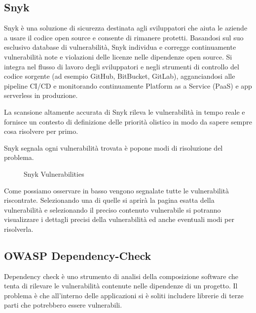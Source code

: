 \subsection{Snyk}
\cite{Snyk}
Snyk è una soluzione di sicurezza destinata agli sviluppatori che aiuta le aziende a usare il codice open source e consente di rimanere protetti. Basandosi sul suo esclusivo database di vulnerabilità, Snyk individua e corregge continuamente vulnerabilità note e violazioni delle licenze nelle dipendenze open source. Si integra nel flusso di lavoro degli sviluppatori e negli strumenti di controllo del codice sorgente (ad esempio GitHub, BitBucket, GitLab), agganciandosi alle pipeline CI/CD e monitorando continuamente Platform as a Service (PaaS) e app serverless in produzione.

La scansione altamente accurata di Snyk rileva le vulnerabilità in tempo reale e fornisce un contesto di definizione delle priorità olistico in modo da sapere sempre cosa risolvere per primo.

Snyk segnala ogni vulnerabilità trovata è popone modi di risoluzione del problema.
\begin{figure}[H]
    \caption{Snyk Vulnerabilities}
    \label{fig:snyk}
\end{figure}
Come possiamo osservare in basso vengono segnalate tutte le vulnerabilità riscontrate. Selezionando una di quelle si aprirà la pagina esatta della vulnerabilità e selezionando il preciso contenuto vulnerabile si potranno visualizzare i dettagli precisi della vulnerabilità ed anche eventuali modi per risolverla.
\subsection{OWASP Dependency-Check} 
\cite{Dependency-Check}
Dependency check è uno strumento di analisi della composizione software che tenta di rilevare le vulnerabilità contenute nelle  dipendenze di un progetto. Il problema è che all’interno delle applicazioni si è soliti includere librerie di terze parti che potrebbero essere vulnerabili.


